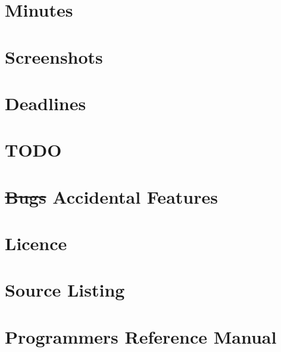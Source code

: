 \documentclass[openany]{book}
\begin{document}
\begin{appendices}
\appendixpage %
\noappendicestocpagenum %
\addappheadtotoc %

\chapter{Minutes}

\chapter{Screenshots}

\chapter{Deadlines}

\chapter{TODO}

\chapter{\sout{Bugs} Accidental Features}

\chapter{Licence}

\chapter{Source Listing}

\chapter{Programmers Reference Manual}

\end{appendices}

\printbibliography
\end{document}
